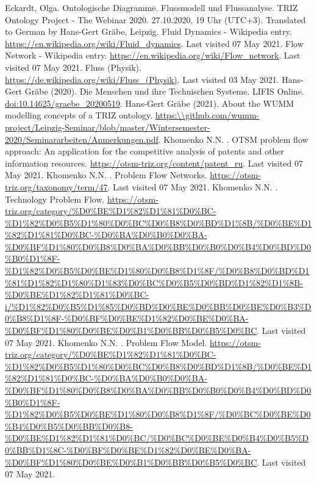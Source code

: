 \documentclass[a4paper,11pt]{article}
\begin{document}
\begin{thebibliography}{...}
    \raggedright
     Eckardt, Olga. Ontologische Diagramme. Flussmodell und Flussanalyse. TRIZ Ontology Project - The Webinar 2020. 27.10.2020, 19 Uhr (UTC+3). Translated to German by Hans-Gert Gräbe, Leipzig. 
     Fluid Dynamics - Wikipedia entry.
        \url{https://en.wikipedia.org/wiki/Fluid_dynamics}. Last visited 07 May 2021.
     Flow Network - Wikipedia entry.
        \url{https://en.wikipedia.org/wiki/Flow_network}. Last visited 07 May 2021.
     Fluss (Physik).
        \url{https://de.wikipedia.org/wiki/Fluss_(Physik)}. Last visited 03 May 2021.
     Hans-Gert Gr\"abe (2020).  Die Menschen und ihre Technischen Systeme. LIFIS Online.
        \url{doi:10.14625/graebe_20200519}.
     Hans-Gert Gr\"abe (2021). About the WUMM modelling concepts of a TRIZ ontology.
        \url{https:\\github.com/wumm-project/Leipzig-Seminar/blob/master/Wintersemester-2020/Seminararbeiten/Anmerkungen.pdf}.
     Khomenko N.N. . OTSM problem flow approach: An application for the competitive analysis of patents and other information resources.
        \url{https://otsm-triz.org/content/patent_ru}. Last visited 07 May 2021.
     Khomenko N.N. . Problem Flow Networks.
        \url{https://otsm-triz.org/taxonomy/term/47}. Last visited 07 May 2021.
     Khomenko N.N. . Technology Problem Flow.
        \url{https://otsm-triz.org/category/%D0%BE%D1%82%D1%81%D0%BC-%D1%82%D0%B5%D1%80%D0%BC%D0%B8%D0%BD%D1%8B/%D0%BE%D1%82%D1%81%D0%BC-%D0%BA%D0%B0%D0%BA-%D0%BF%D1%80%D0%B8%D0%BA%D0%BB%D0%B0%D0%B4%D0%BD%D0%B0%D1%8F-%D1%82%D0%B5%D0%BE%D1%80%D0%B8%D1%8F/%D0%B8%D0%BD%D1%81%D1%82%D1%80%D1%83%D0%BC%D0%B5%D0%BD%D1%82%D1%8B-%D0%BE%D1%82%D1%81%D0%BC-i/%D1%82%D0%B5%D1%85%D0%BD%D0%BE%D0%BB%D0%BE%D0%B3%D0%B8%D1%8F-%D0%BF%D0%BE%D1%82%D0%BE%D0%BA-%D0%BF%D1%80%D0%BE%D0%B1%D0%BB%D0%B5%D0%BC}. Last visited 07 May 2021.
     Khomenko N.N. . Problem Flow Model.
        \url{https://otsm-triz.org/category/%D0%BE%D1%82%D1%81%D0%BC-%D1%82%D0%B5%D1%80%D0%BC%D0%B8%D0%BD%D1%8B/%D0%BE%D1%82%D1%81%D0%BC-%D0%BA%D0%B0%D0%BA-%D0%BF%D1%80%D0%B8%D0%BA%D0%BB%D0%B0%D0%B4%D0%BD%D0%B0%D1%8F-%D1%82%D0%B5%D0%BE%D1%80%D0%B8%D1%8F/%D0%BC%D0%BE%D0%B4%D0%B5%D0%BB%D0%B8-%D0%BE%D1%82%D1%81%D0%BC/%D0%BC%D0%BE%D0%B4%D0%B5%D0%BB%D1%8C-%D0%BF%D0%BE%D1%82%D0%BE%D0%BA-%D0%BF%D1%80%D0%BE%D0%B1%D0%BB%D0%B5%D0%BC}. Last visited 07 May 2021.

\end{thebibliography}
\end{document}
